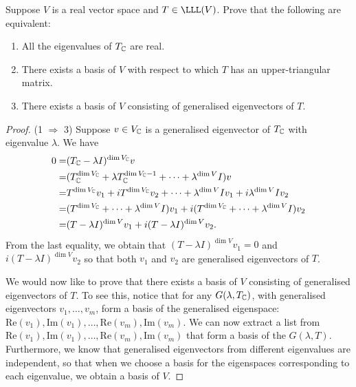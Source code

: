 \begin{exercise}{18}
  Suppose $V$ is a real vector space and $T\in\LLL(V)$. Prove that the following are equivalent:
  \begin{enumerate}
      \item All the eigenvalues of $T_{\mathbb{C}}$ are real.
      \item There exists a basis of $V$ with respect to which $T$ has an upper-triangular matrix.
      \item There exists a basis of $V$ consisting of generalised eigenvectors of $T$.
  \end{enumerate}
\end{exercise}
\begin{proof}
    (1 $\Rightarrow$ 3) 
    Suppose $v\in V_{\mathbb{C}}$ is a generalised eigenvector of $T_{\mathbb{C}}$ with eigenvalue $\lambda$. We have
    \begin{align*}
        0 =& (T_{\mathbb{C}}-\lambda I)^{\dim V_{\mathbb{C}}}v\\
        =& (T_{\mathbb{C}}^{\dim V_{\mathbb{C}}}+\lambda T_{\mathbb{C}}^{\dim V_{\mathbb{C}}-1}+\dots+\lambda^{\dim V}I)v\\
        =& T^{\dim V_{\mathbb{C}}}v_1+iT^{\dim V_{\mathbb{C}}}v_2+\dots+\lambda^{\dim V}Iv_1+i\lambda^{\dim V}Iv_2\\
        =& (T^{\dim V_{\mathbb{C}}}+\dots+\lambda^{\dim V}I)v_1+i(T^{\dim V_{\mathbb{C}}}+\dots+\lambda^{\dim V}I)v_2\\
        =& (T-\lambda I)^{\dim V}v_1+i(T-\lambda I)^{\dim V}v_2.
    \end{align*}
    From the last equality, we obtain that $(T-\lambda I)^{\dim V}v_1=0$ and $i(T-\lambda I)^{\dim V}v_2$ so that both $v_1$ and $v_2$ are generalised eigenvectors of $T$.

    We would now like to prove that there exists a basis of $V$ consisting of generalised eigenvectors of $T$. To see this, notice that for any $G(\lambda,T_{\mathbb{C}})$, with generalised eigenvectors $v_1,\dots,v_m$, form a basis of the generalised eigenspace:\\ $\text{Re}(v_1),\text{Im}(v_1),\dots,\text{Re}(v_m),\text{Im}(v_m)$. We can now extract a list from\\ $\text{Re}(v_1),\text{Im}(v_1),\dots,\text{Re}(v_m),\text{Im}(v_m)$ that form a basis of the $G(\lambda, T)$. Furthermore, we know that generalised eigenvectors from different eigenvalues are independent, so that when we choose a basis for the eigenspaces corresponding to each eigenvalue, we obtain a basis of $V$.
    

\end{proof}
